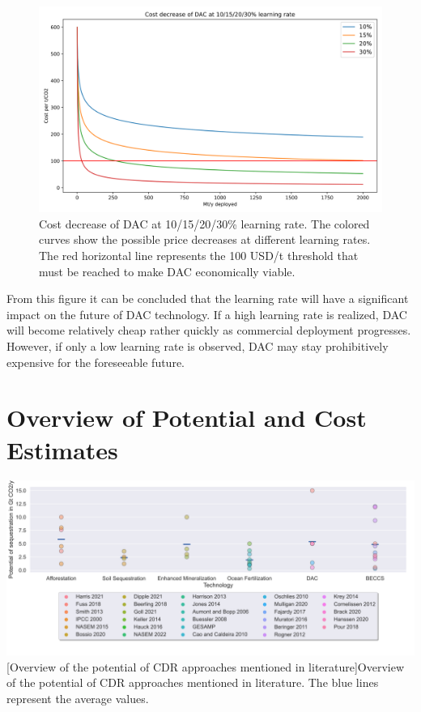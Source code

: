 \begin{figure}[ht!]
    \includegraphics[width=\textwidth]{figures/dac_learning.png}
    \caption[Cost decrease of DAC at 10/15/20/30\% learning rate]{Cost decrease of DAC at 10/15/20/30\% learning rate. The colored curves show the possible price decreases at different learning rates. The red horizontal line represents the 100 USD/t threshold that must be reached to make DAC economically viable.}
\end{figure}
\newpage
\noindent From this figure it can be concluded that the learning rate will have a significant impact on the future of DAC technology. If a high learning rate is realized, DAC will become relatively cheap rather quickly as commercial deployment progresses. However, if only a low learning rate is observed, DAC may stay prohibitively expensive for the foreseeable future.

\chapter{Overview of Potential and Cost Estimates}
 \mbox{} \begin{center}
    \begin{sideways}%
    \captionsetup{margin=0cm}
         \begin{minipage}{1.2\linewidth}
            \includegraphics[width=550pt, keepaspectratio]{figures/potential.png}
            [Overview of the potential of CDR approaches mentioned in literature]{Overview of the potential of CDR approaches mentioned in literature. The blue lines represent the average values.}
         \vspace{0.2cm}
         \label{fig:xx}
         \end{minipage}
    \end{sideways}
    \end{center}

